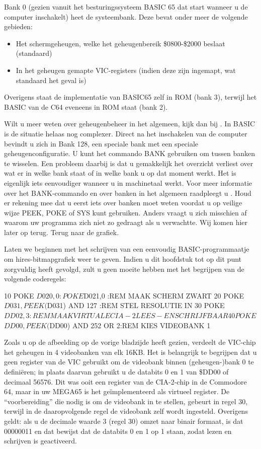 Bank 0 (gezien vanuit het besturingssysteem BASIC 65 dat start wanneer u de computer inschakelt) heet de systeembank. Deze bevat onder meer de volgende gebieden:

\begin{itemize}
  \item Het schermgeheugen, welke het geheugenbereik \$0800-\$2000 beslaat (standaard)  \item In het geheugen gemapte VIC-registers (indien deze zijn ingemapt, wat standaard het geval is)
\end{itemize}

Overigens staat de implementatie van BASIC65 zelf in ROM (bank 3), terwijl het BASIC van de C64 eveneens in ROM staat (bank 2).

Wilt u meer weten over geheugenbeheer in het algemeen, kijk dan bij . In BASIC is de situatie helaas nog complexer. Direct na het inschakelen van de computer bevindt u zich in Bank 128, een speciale bank met een speciale geheugenconfiguratie. U kunt het commando BANK gebruiken om tussen banken te wisselen. Een probleem daarbij is dat u gemakkelijk het overzicht verliest over wat er in welke bank staat of in welke bank u op dat moment werkt. Het is eigenlijk iets eenvoudiger wanneer u in machinetaal werkt. Voor meer informatie over het BANK-commando en over banken in het algemeen raadpleegt u . Houd er rekening mee dat u eerst iets over banken moet weten voordat u op veilige wijze PEEK, POKE of SYS kunt gebruiken. Anders vraagt u zich misschien af waarom uw programma zich niet zo gedraagt als u verwachtte. Wij komen hier later op terug. Terug naar de grafiek.

Laten we beginnen met het schrijven van een eenvoudig BASIC-programmaatje om hires-bitmapgrafiek weer te geven. Indien u dit hoofdstuk tot op dit punt zorgvuldig heeft gevolgd, zult u geen moeite hebben met het begrijpen van de volgende coderegels:

\begin{screencode}
10 POKE $D020,0 : POKE $D021,0          :REM MAAK SCHERM ZWART
20 POKE $D031, PEEK($D031) AND 127      :REM STEL RESOLUTIE IN
30 POKE $DD02, 3                        :REM MAAK VIRTUALE CIA-2 LEES- EN SCHRIJFBAAR
40 POKE $$DD00, PEEK($DD00) AND 252 OR 2:REM KIES VIDEOBANK 1
\end{screencode}

Zoals u op de afbeelding op de vorige bladzijde heeft gezien, verdeelt de VIC-chip het geheugen in 4 videobanken van elk 16KB. Het is belangrijk te begrijpen dat u geen register van de VIC gebruikt om de videobank binnen (geheugen-)bank 0 te definiëren; in plaats daarvan gebruikt u de databits 0 en 1 van \$DD00 of decimaal 56576. Dit was ooit een register van de CIA-2-chip in de Commodore 64, maar in uw MEGA65 is het geïmplementeerd als virtueel register. De ``voorbereiding'' die nodig is om de videobank in te stellen, gebeurt in regel 30, terwijl in de daaropvolgende regel de videobank zelf wordt ingesteld. Overigens geldt: als u de decimale waarde 3 (regel 30) omzet naar binair formaat, is dat 00000011 en dat bewijst dat de databits 0 en 1 op 1 staan, zodat lezen en schrijven is geactiveerd.


